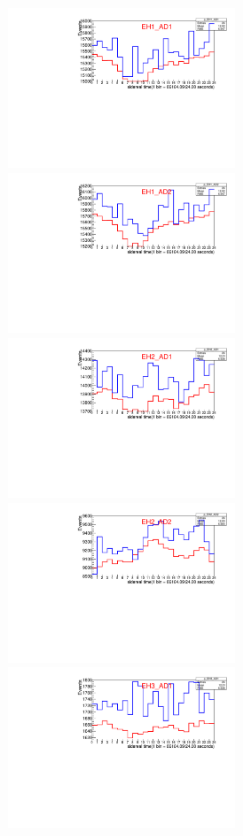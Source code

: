 \documentclass[amsmath, amssymb,
nobibnotes, superscriptaddress]{revtex4-1}
\begin{document}

\begin{figure}[H] 
\begin{center}
\includegraphics[width=6cm]{MeasurementPredictionEH1_AD1.pdf}
\includegraphics[width=6cm]{MeasurementPredictionEH1_AD2.pdf}\\
\includegraphics[width=6cm]{MeasurementPredictionEH2_AD1.pdf}
\includegraphics[width=6cm]{MeasurementPredictionEH2_AD2.pdf}\\
\includegraphics[width=6cm]{MeasurementPredictionEH3_AD1.pdf}

\end{center}
\end{figure}
\end{document}

